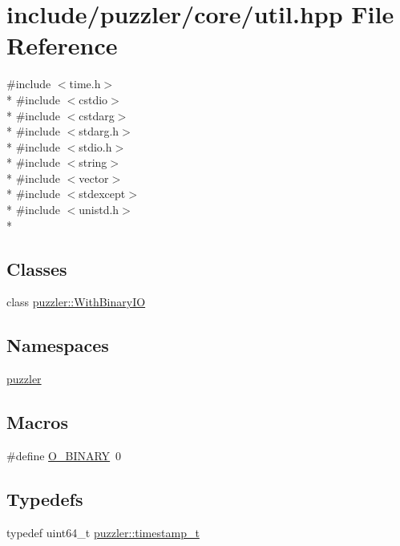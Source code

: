 \hypertarget{a00127}{}\section{include/puzzler/core/util.hpp File Reference}
\label{a00127}
{\ttfamily \#include $<$time.\+h$>$}\\*
{\ttfamily \#include $<$cstdio$>$}\\*
{\ttfamily \#include $<$cstdarg$>$}\\*
{\ttfamily \#include $<$stdarg.\+h$>$}\\*
{\ttfamily \#include $<$stdio.\+h$>$}\\*
{\ttfamily \#include $<$string$>$}\\*
{\ttfamily \#include $<$vector$>$}\\*
{\ttfamily \#include $<$stdexcept$>$}\\*
{\ttfamily \#include $<$unistd.\+h$>$}\\*
\subsection*{Classes}
\begin{DoxyCompactItemize}
\item 
class \hyperlink{a00036}{puzzler\+::\+With\+Binary\+I\+O}
\end{DoxyCompactItemize}
\subsection*{Namespaces}
\begin{DoxyCompactItemize}
\item 
 \hyperlink{a00145}{puzzler}
\end{DoxyCompactItemize}
\subsection*{Macros}
\begin{DoxyCompactItemize}
\item 
\#define \hyperlink{a00127_a36fa9b2e726512bc17a7a6d3e39002be}{O\+\_\+\+B\+I\+N\+A\+R\+Y}~0
\end{DoxyCompactItemize}
\subsection*{Typedefs}
\begin{DoxyCompactItemize}
\item 
typedef uint64\+\_\+t \hyperlink{a00145_a981d458d56663fa1288f37f9c4735ee4}{puzzler\+::timestamp\+\_\+t}
\end{DoxyCompactItemize}
